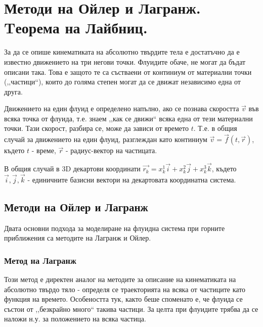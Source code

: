 \section{Методи на Ойлер и Лагранж. Tеорема на Лайбниц.}
За да се опише кинематиката на абсолютно твърдите тела е достатъчно да е известно движението на три негови точки. Флуидите обаче, не могат да бъдат описани така. Това е защото
те са състваени от континиум от материални точки (,,частици``), които до голяма степен могат да се движат независимо една от друга.

Движението на един флуид е определено напълно, ако се познава скоростта $\vec{v}$ във всяка точка от флуида, т.е. знаем ,,как се движи`` всяка една от тези материални точки.
Тази скорост, разбира се, може да зависи от времето $t$. Т.е. в общия случай за движението на един флуид, разглеждан като континиум $\vec{v} = \vec{f}(t,\vec{r})$, където $t$ - време,
$\vec{r}$ - радиус-вектор на частицата.

В общия случай в 3D декартови координати $\vec{r_k} = x_k^1 \vec{i} + x_k^2 \vec{j} + x_k^3 \vec{k}$, където $\vec{i}, \vec{j}, \vec{k}$ - единичните базисни вектори на декартовата координатна система.
\subsection{Методи на Ойлер и Лагранж}
Двата основни подхода за моделиране на флуидна система при горните приближения са методите на Лагранж и Ойлер.
\subsubsection{Метод на Лагранж}
Този метод е директен аналог на методите за описание на кинематиката на абсолютно твърдо тяло - определя се траекторията на всяка от частиците като функция на времето. Особеността  тук, както беше споменато е,
че флуида се състои от ,,безкрайно много`` такива частици. За целта при флуидите трябва да се наложи н.у. за положението на всяка частица.

